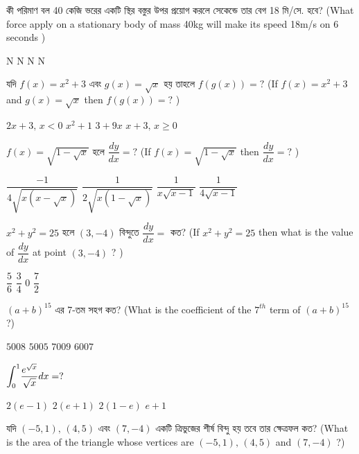 \documentclass[addpoints]{exam}
\begin{document}
\begin{questions}
\question কী পরিমাণ বল 40 কেজি ভরের একটি স্থির বস্তুর উপর প্রয়োগ করলে সেকেন্ডে তার বেগ 18 মি/সে. হবে? (What force apply on a stationary body of mass 40kg will make its speed 18m/s on 6 seconds )

\begin{oneparchoices}
 N
 N
 N
 N
\end{oneparchoices}

\question যদি $ f(x) = x^{2}+3 $ এবং $ g(x) = \sqrt{x} $ হয় তাহলে $ f(g(x)) = ? $ (If $ f(x) = x^{2}+3 $ and $ g(x) = \sqrt{x} $ then $ f(g(x)) = ? $ )

\begin{oneparchoices}
\choice $ 2x+3,\, x<0 $
\choice $ x^{2}+1 $
\choice $ 3+9x $
\choice $ x+3,\,x\ge 0 $
\end{oneparchoices}

\question $ f(x) = \sqrt{1-\sqrt{x}} $  হলে $ \dfrac{dy}{dx}=?  $ (If $ f(x) = \sqrt{1-\sqrt{x}} $ then $ \dfrac{dy}{dx}=?  $ )

\begin{oneparchoices}
\choice $ \dfrac{-1}{4\sqrt{x(x-\sqrt{x})}} $
\choice $ \dfrac{1}{2\sqrt{x(1-\sqrt{x})}} $
\choice $ \dfrac{1}{x\sqrt{x-1}} $
\choice $ \dfrac{1}{4\sqrt{x-1}} $
\end{oneparchoices}

\question $ x^{2}+y^{2}=25 $ হলে $ (3,-4) $ বিন্দুতে $ \dfrac{dy}{dx} = $ কত? (If $ x^{2}+y^{2}=25 $ then what is the value of $ \dfrac{dy}{dx} $ at point $ (3,-4) $ ? )

\begin{oneparchoices}
\choice $ \dfrac{5}{6} $
\choice $ \dfrac{3}{4} $
\choice $ 0 $
\choice  $ \dfrac{7}{2} $
\end{oneparchoices}

\question  $ (a+b)^{15} $ এর 7-তম সহগ কত? (What is the coefficient of the $ 7^{th} $ term of $ (a+b)^{15} $ ?)

\begin{oneparchoices}
\choice $ 5008 $
\choice $ 5005 $
\choice $ 7009 $
\choice $ 6007 $
\end{oneparchoices}

\question  $ \mathlarger{\int_{0}^{1}}\dfrac{e^{\sqrt{x}}}{\sqrt{x}}dx=? $

\begin{oneparchoices}
\choice  $ 2(e-1) $
\choice  $ 2(e+1) $
\choice  $ 2(1-e) $
\choice  $ e+1 $
\end{oneparchoices}

\question  যদি $ (-5,1),\,(4,5) $ এবং $ (7,-4) $ একটি ত্রিভুজের শীর্ষ বিন্দু হয় তবে তার ক্ষেত্রফল কত? (What is the area of the triangle whose vertices are $ (-5,1),\,(4,5) $ and  $ (7,-4) $ ?)



\end{questions}
\end{document}
